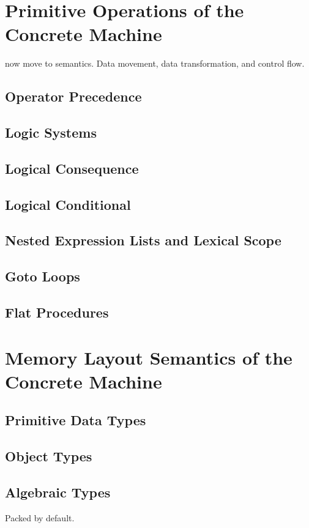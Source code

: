\documentclass[11pt]{book}
\begin{document}
\chapter{Primitive Operations of the Concrete Machine}

now move to semantics. Data movement, data transformation, and control flow.

\section{Operator Precedence}
\section{Logic Systems}
\section{Logical Consequence}
\section{Logical Conditional}
\section{Nested Expression Lists and Lexical Scope}
\section{Goto Loops}
\section{Flat Procedures}


\chapter{Memory Layout Semantics of the Concrete Machine} 
\section{Primitive Data Types}
\section{Object Types}
\section{Algebraic Types}

Packed by default.
\end{document}
